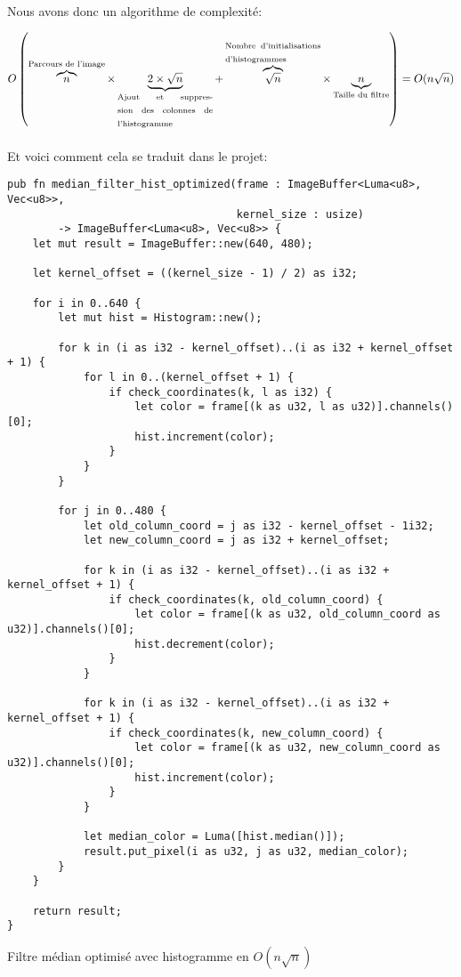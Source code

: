 \documentclass{report}
\begin{document}
\paragraph{} Nous avons donc un algorithme de complexité:

\[
	O\left(\overbrace{n}^\text{Parcours de l'image} \times
	  \underbrace{2 \times \sqrt{n}}_\text{\parbox{3cm}{Ajout et suppression des colonnes de l'histogramme}} +
	  \overbrace{\sqrt{n}}^\text{\parbox{3cm}{Nombre d'initialisations d'histogrammes}} \times
	  \underbrace{n}_\text{Taille du filtre}\right) = O(n\sqrt{n})
\]

\paragraph{} Et voici comment cela se traduit dans le projet:

\begin{listing}[H]
\begin{verbatim}
pub fn median_filter_hist_optimized(frame : ImageBuffer<Luma<u8>, Vec<u8>>,
                                    kernel_size : usize)
		-> ImageBuffer<Luma<u8>, Vec<u8>> {
	let mut result = ImageBuffer::new(640, 480);

	let kernel_offset = ((kernel_size - 1) / 2) as i32;

	for i in 0..640 {
		let mut hist = Histogram::new();

		for k in (i as i32 - kernel_offset)..(i as i32 + kernel_offset + 1) {
			for l in 0..(kernel_offset + 1) {
				if check_coordinates(k, l as i32) {
					let color = frame[(k as u32, l as u32)].channels()[0];
					hist.increment(color);
				}
			}
		}

		for j in 0..480 {
			let old_column_coord = j as i32 - kernel_offset - 1i32;
			let new_column_coord = j as i32 + kernel_offset;

			for k in (i as i32 - kernel_offset)..(i as i32 + kernel_offset + 1) {
				if check_coordinates(k, old_column_coord) {
					let color = frame[(k as u32, old_column_coord as u32)].channels()[0];
					hist.decrement(color);
				}
			}

			for k in (i as i32 - kernel_offset)..(i as i32 + kernel_offset + 1) {
				if check_coordinates(k, new_column_coord) {
					let color = frame[(k as u32, new_column_coord as u32)].channels()[0];
					hist.increment(color);
				}
			}

			let median_color = Luma([hist.median()]);
			result.put_pixel(i as u32, j as u32, median_color);
		}
	}

	return result;
}
\end{verbatim}
\label{lst:median_filter_hist_opti}
\caption{Filtre médian optimisé avec histogramme en $O(n\sqrt{n})$}
\end{listing}
\end{document}
